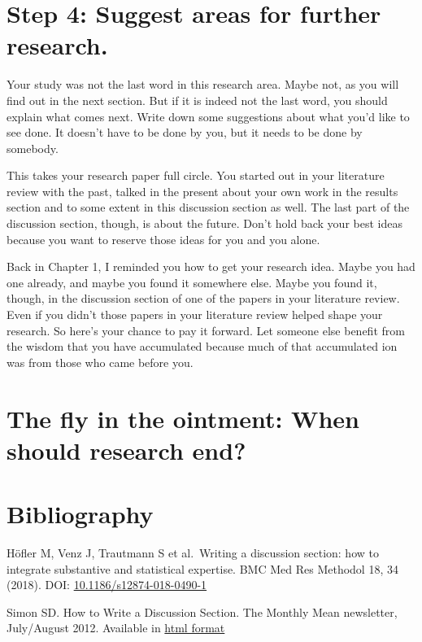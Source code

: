 \documentclass[
  letterpaper,
  DIV=11,
  numbers=noendperiod]{scrreprt}
\begin{document}
\begin{tcolorbox}
\section{Step 4: Suggest areas for further
research.}\label{step-4-suggest-areas-for-further-research.}

Your study was not the last word in this research area. Maybe not, as
you will find out in the next section. But if it is indeed not the last
word, you should explain what comes next. Write down some suggestions
about what you'd like to see done. It doesn't have to be done by you,
but it needs to be done by somebody.

This takes your research paper full circle. You started out in your
literature review with the past, talked in the present about your own
work in the results section and to some extent in this discussion
section as well. The last part of the discussion section, though, is
about the future. Don't hold back your best ideas because you want to
reserve those ideas for you and you alone.

Back in Chapter 1, I reminded you how to get your research idea. Maybe
you had one already, and maybe you found it somewhere else. Maybe you
found it, though, in the discussion section of one of the papers in your
literature review. Even if you didn't those papers in your literature
review helped shape your research. So here's your chance to pay it
forward. Let someone else benefit from the wisdom that you have
accumulated because much of that accumulated ion was from those who came
before you.

\section{The fly in the ointment: When should research
end?}\label{the-fly-in-the-ointment-when-should-research-end}

\section{Bibliography}\label{bibliography-20}

Höfler M, Venz J, Trautmann S et al.~Writing a discussion section: how
to integrate substantive and statistical expertise. BMC Med Res Methodol
18, 34 (2018). DOI:
\href{https://doi.org/10.1186/s12874-018-0490-1}{10.1186/s12874-018-0490-1}

Simon SD. How to Write a Discussion Section. The Monthly Mean
newsletter, July/August 2012. Available in
\href{http://www.pmean.com/news/201207.html\#1}{html format}


\end{tcolorbox}
\end{document}
